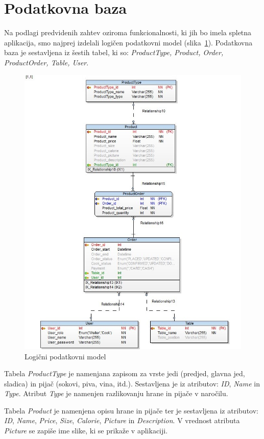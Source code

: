 \documentclass[a4paper, 12pt]{book}
\begin{document}
\section{Podatkovna baza}
Na podlagi predvidenih zahtev oziroma funkcionalnosti, ki jih bo imela spletna aplikacija, smo najprej izdelali logičen podatkovni model (slika~\ref{Database_physical}). Podatkovna baza je sestavljena iz šestih tabel, ki so: \textit{ProductType, Product,  Order, ProductOrder, Table, User}. 

\begin{figure}[!htb]
\centering
\includegraphics[width=12cm]{Database_physical}
\caption{Logični podatkovni model}
\label{Database_physical}
\end{figure}

Tabela \textit{ProductType} je namenjana zapisom za vrste jedi (predjed, glavna jed, sladica) in pijač (sokovi, piva, vina, itd.). Sestavljena je iz atributov: \textit{ID}, \textit{Name} in \textit{Type}. Atribut \textit{Type} je namenjen razlikovanju hrane in pijače v naročilu.

Tabela \textit{Product} je namenjena opisu hrane in pijače ter je sestavljena iz atributov: \textit{ID}, \textit{Name}, \textit{Price}, \textit{Size}, \textit{Calorie}, \textit{Picture} in \textit{Description}. V vrednost atributa \textit{Picture} se zapiše ime slike, ki se prikaže v aplikaciji.
\end{document}
